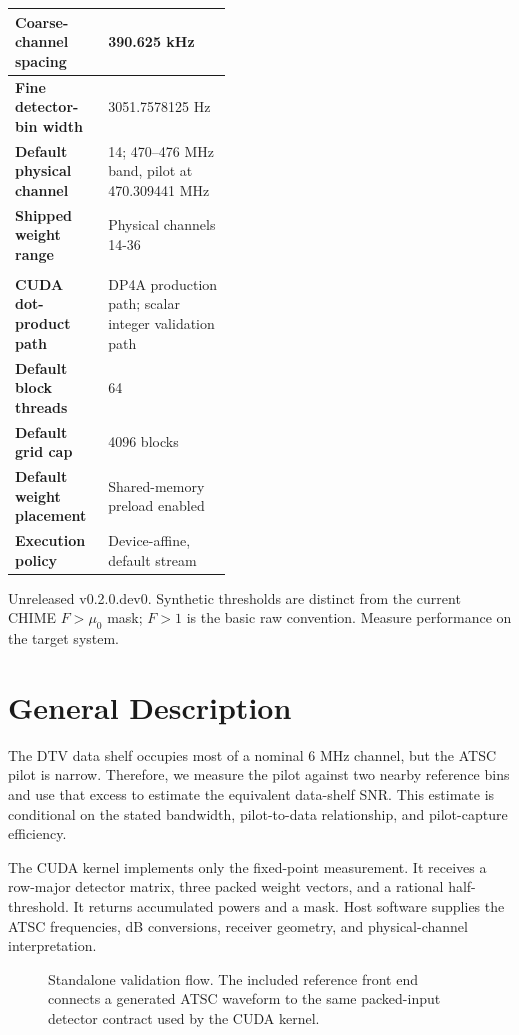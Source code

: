 \documentclass[10pt,letterpaper]{article}
\begin{document}
\begin{minipage}[t]{0.48\textwidth}
\begin{tabularx}{\linewidth}{|>{\bfseries}L{0.43\linewidth}|Y|}
Coarse-channel spacing & 390.625 kHz \\ \hline
Fine detector-bin width & 3051.7578125 Hz \\ \hline
Default physical channel & 14; 470--476 MHz band, pilot at 470.309441 MHz \\ \hline
Shipped weight range & Physical channels 14-36 \\ \hline
{}\\ \hline
CUDA dot-product path & DP4A production path; scalar integer validation path \\ \hline
Default block threads & 64 \\ \hline
Default grid cap & 4096 blocks \\ \hline
Default weight placement & Shared-memory preload enabled \\ \hline
Execution policy & Device-affine, default stream \\ \hline
\end{tabularx}
\end{minipage}

\vfill
{\small\color{FStatGray}Unreleased v0.2.0.dev0. Synthetic thresholds are distinct from the current CHIME $F>\mu_0$ mask; $F>1$ is the basic raw convention. Measure performance on the target system.}

\newpage
\tableofcontents
\newpage

\section{General Description}

The DTV data shelf occupies most of a nominal 6 MHz channel, but the ATSC pilot is narrow. Therefore, we measure the pilot against two nearby reference bins and use that excess to estimate the equivalent data-shelf SNR. This estimate is conditional on the stated bandwidth, pilot-to-data relationship, and pilot-capture efficiency.

The CUDA kernel implements only the fixed-point measurement. It receives a row-major detector matrix, three packed weight vectors, and a rational half-threshold. It returns accumulated powers and a mask. Host software supplies the ATSC frequencies, dB conversions, receiver geometry, and physical-channel interpretation.


\begin{figure}[H]
\centering

\caption{Standalone validation flow. The included reference front end connects a generated ATSC waveform to the same packed-input detector contract used by the CUDA kernel.}
\label{fig:validation_flow}
\end{figure}
\end{document}
